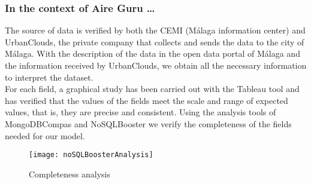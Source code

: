 \subsubsection*{In the context of Aire Guru \ldots} 

The source of data is verified by both the CEMI (Málaga information center) and UrbanClouds, the private company
that collects and sends the data to the city of Málaga. With the description of the data in the open data portal of Málaga and the information received by UrbanClouds,
we obtain all the necessary information to interpret the dataset. \\

For each field, a graphical study has been carried out with the Tableau tool and has verified that the values of the
fields meet the scale and range of expected values, that is, they are precise and consistent.
Using the analysis tools of MongoDBCompas and NoSQLBooster we verify the completeness of the fields needed for our model.

\begin{figure}[ht]
    \centering
    \texttt{[image: noSQLBoosterAnalysis]}
    \caption{Completeness analysis}
\end{figure}